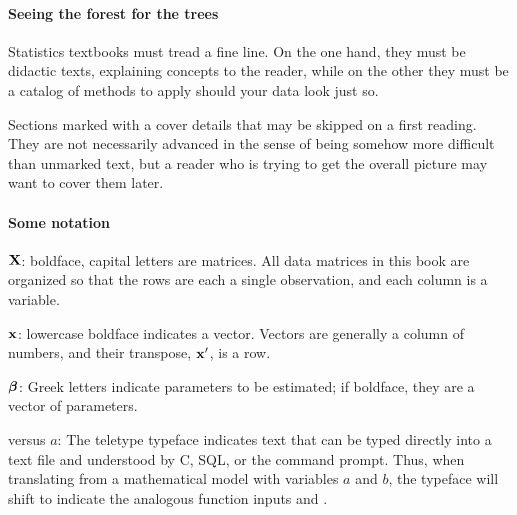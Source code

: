 \paragraph{\treesymbol Seeing the forest for the trees} Statistics textbooks
must tread a fine line. On the one hand, they must be didactic texts,
explaining concepts to the reader, while on the other they must be a
catalog of methods to apply should your data look just so.

Sections marked with a \ind{\treesymbol} cover details that may be
skipped on a first reading. They are not necessarily advanced
in the sense of being somehow more difficult than unmarked text, but a
reader who is trying to get the overall picture may want to cover them 
later. 

\paragraph{Some notation}  \hfill

${\bf X}$: boldface, capital letters are matrices. All data matrices in this
book are organized so that the rows are each a single observation, and
each column is a variable.

${\bf x}$: lowercase boldface indicates a vector. Vectors are generally a
column of numbers, and their transpose, ${\bf x}'$, is a row.

${\mbox{\boldmath$\beta$}}$: Greek letters indicate parameters to be estimated;
if boldface, they are a vector of parameters.

 versus $a$: The teletype typeface indicates text
that can be typed directly into a text file and understood by C, SQL, or
the command prompt. Thus, when translating from a mathematical model
with variables $a$ and $b$, the typeface will shift to indicate the
analogous function inputs  and .



